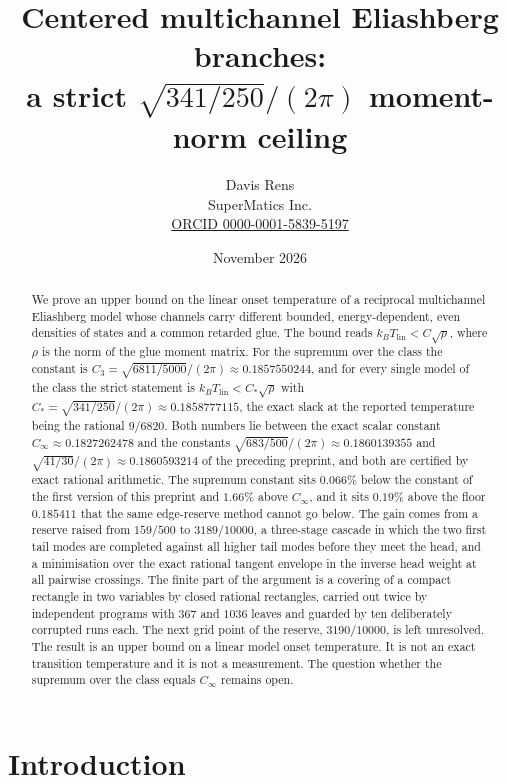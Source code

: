\documentclass[10pt]{article}
\title{Centered multichannel Eliashberg branches:\\ a strict $\sqrt{341/250}/(2\pi)$ moment-norm ceiling}
\author{Davis Rens\\SuperMatics Inc.\\\href{https://orcid.org/0000-0001-5839-5197}{ORCID 0000-0001-5839-5197}}
\date{November 2026}
\theoremstyle{remark}
\newcommand{\Cinf}{C_\infty}
\newcommand{\Cstar}{C_{*}}
\newcommand{\Cthree}{C_{3}}
\begin{document}
\maketitle

\begin{abstract}
We prove an upper bound on the linear onset temperature of a reciprocal multichannel Eliashberg model whose channels carry different bounded, energy-dependent, even densities of states and a common retarded glue. The bound reads $k_BT_{\mathrm{lin}}<C\sqrt\rho$, where $\rho$ is the norm of the glue moment matrix. For the supremum over the class the constant is $\Cthree=\sqrt{6811/5000}/(2\pi)\approx0.1857550244$, and for every single model of the class the strict statement is $k_BT_{\mathrm{lin}}<\Cstar\sqrt\rho$ with $\Cstar=\sqrt{341/250}/(2\pi)\approx0.1858777115$, the exact slack at the reported temperature being the rational $9/6820$. Both numbers lie between the exact scalar constant $\Cinf\approx0.1827262478$ and the constants $\sqrt{683/500}/(2\pi)\approx0.1860139355$ and $\sqrt{41/30}/(2\pi)\approx0.1860593214$ of the preceding preprint, and both are certified by exact rational arithmetic. The supremum constant sits $0.066\%$ below the constant of the first version of this preprint and $1.66\%$ above $\Cinf$, and it sits $0.19\%$ above the floor $0.185411$ that the same edge-reserve method cannot go below. The gain comes from a reserve raised from $159/500$ to $3189/10000$, a three-stage cascade in which the two first tail modes are completed against all higher tail modes before they meet the head, and a minimisation over the exact rational tangent envelope in the inverse head weight at all pairwise crossings. The finite part of the argument is a covering of a compact rectangle in two variables by closed rational rectangles, carried out twice by independent programs with $367$ and $1036$ leaves and guarded by ten deliberately corrupted runs each. The next grid point of the reserve, $3190/10000$, is left unresolved. The result is an upper bound on a linear model onset temperature. It is not an exact transition temperature and it is not a measurement. The question whether the supremum over the class equals $\Cinf$ remains open.
\end{abstract}

\section{Introduction}
\end{document}
